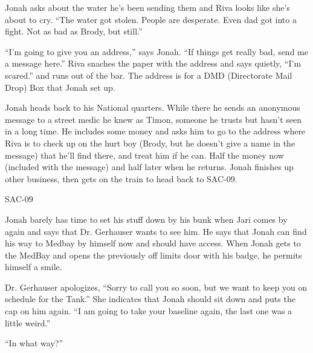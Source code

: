 Jonah asks about the water he's been sending them and Riva looks like she's about to cry.  ``The water got stolen.  People are desperate.  Even dad got into a fight.  Not as bad as Brody, but still.''



``I'm going to give you an address,'' says Jonah. ``If things get really bad, send me a message here.''  Riva snaches the paper with the address and says quietly, ``I'm scared.'' and runs out of the bar.  The address is for a DMD (Directorate Mail Drop) Box that Jonah set up.



Jonah heads back to his National quarters.  While there he sends an anonymous message to a street medic he knew as Timon, someone he trusts but hasn't seen in a long time.  He includes some money and asks him to go to the address where Riva is to check up on the hurt boy (Brody, but he doesn't give a name in the message) that he'll find there, and treat him if he can.  Half the money now (included with the message) and half later when he returns.  Jonah finishes up other business, then gets on the train to head back to SAC-09.



 {\LARGE SAC-09 } 



Jonah barely has time to set his stuff down by his bunk when Jari comes by again and says that Dr. Gerhauser wants to see him.  He says that Jonah can find his way to Medbay by himself now and should have access.  When Jonah gets to the MedBay and opens the previously off limits door with his badge, he permits himself a smile.



Dr. Gerhauser apologizes, ``Sorry to call you so soon, but we want to keep you on schedule for the Tank.''  She indicates that Jonah should sit down and puts the cap on him again.  ``I am going to take your baseline again, the last one was a little weird.''

``In what way?''

